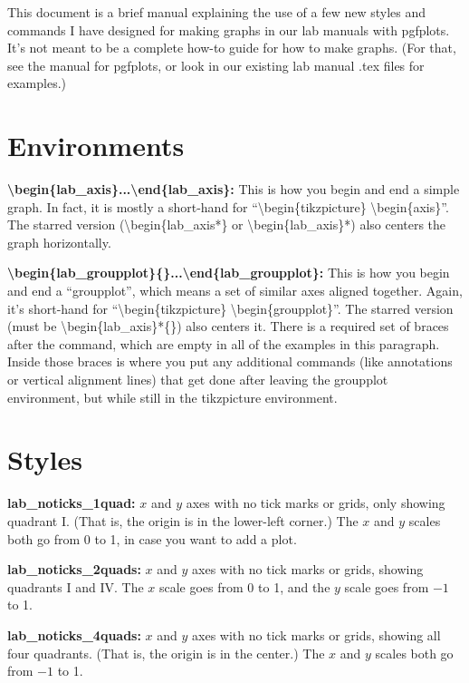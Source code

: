 \documentclass{article}
\begin{document}
This document is a brief manual explaining the use of a few new styles and commands I have designed for making graphs in our lab manuals with pgfplots.  It's not meant to be a complete how-to guide for how to make graphs.  (For that, see the manual for pgfplots, or look in our existing lab manual .tex files for examples.)

\section{Environments}

\textbf{\textbackslash begin\{lab\_axis\}...\textbackslash end\{lab\_axis\}:} This is how you begin and end a simple graph.  In fact, it is mostly a short-hand for ``\textbackslash begin\{tikzpicture\} \textbackslash begin\{axis\}''.  The starred version (\textbackslash begin\{lab\_axis*\} or \textbackslash begin\{lab\_axis\}*) also centers the graph horizontally.

\textbf{\textbackslash begin\{lab\_groupplot\}\{\}...\textbackslash end\{lab\_groupplot\}:} This is how you begin and end a ``groupplot'', which means a set of similar axes aligned together.  Again, it's short-hand for ``\textbackslash begin\{tikzpicture\} \textbackslash begin\{groupplot\}''.  The starred version (must be \textbackslash begin\{lab\_axis\}*\{\}) also centers it.  There is a required set of braces after the command, which are empty in all of the examples in this paragraph.  Inside those braces is where you put any additional commands (like annotations or vertical alignment lines) that get done after leaving the groupplot environment, but while still in the tikzpicture environment.

\section{Styles}

\textbf{lab\_noticks\_1quad:} $x$ and $y$ axes with no tick marks or grids, only showing quadrant I.  (That is, the origin is in the lower-left corner.)  The $x$ and $y$ scales both go from 0 to 1, in case you want to add a plot.

\textbf{lab\_noticks\_2quads:} $x$ and $y$ axes with no tick marks or grids, showing quadrants I and IV.  The $x$ scale goes from 0 to 1, and the $y$ scale goes from $-1$ to 1.

\textbf{lab\_noticks\_4quads:} $x$ and $y$ axes with no tick marks or grids, showing all four quadrants.  (That is, the origin is in the center.)  The $x$ and $y$ scales both go from $-1$ to 1.
\end{document}
